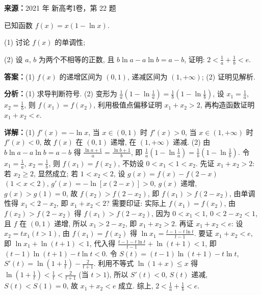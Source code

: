 \begin{question}[points=12]
\textbf{来源：}2021 年 新高考I卷，第 22 题\par
已知函数 $f(x) = x(1 - \ln x)$.

(1) 讨论 $f(x)$ 的单调性;

(2) 设 $a$, $b$ 为两个不相等的正数, 且 $b\ln a - a\ln b = a - b$, 证明: $2 < \frac{1}{a} + \frac{1}{b} < e$.
\begin{solution}
\textbf{答案：}(1) $f(x)$ 的递增区间为 $(0,1)$, 递减区间为 $(1,+\infty)$; (2) 证明见解析.

\textbf{分析：}(1) 求导判断符号. (2) 变形为 $\frac{1}{a}(1-\ln\frac{1}{a}) = \frac{1}{b}(1-\ln\frac{1}{b})$, 设 $x_1 = \frac{1}{a}$, $x_2 = \frac{1}{b}$, 则 $f(x_1) = f(x_2)$, 利用极值点偏移证明 $x_1 + x_2 > 2$, 再构造函数证明 $x_1 + x_2 < e$.

\textbf{详解：}(1) $f'(x) = -\ln x$, 当 $x \in (0,1)$ 时 $f'(x) > 0$, 当 $x \in (1,+\infty)$ 时 $f'(x) < 0$, 故 $f(x)$ 在 $(0,1)$ 递增, 在 $(1,+\infty)$ 递减.
(2) 由 $b\ln a - a\ln b = a - b$ 得 $\frac{\ln a + 1}{a} = \frac{\ln b + 1}{b}$, 即 $\frac{1}{a}(1-\ln\frac{1}{a}) = \frac{1}{b}(1-\ln\frac{1}{b})$. 令 $x_1 = \frac{1}{a}$, $x_2 = \frac{1}{b}$, 则 $f(x_1) = f(x_2)$, 不妨设 $0 < x_1 < 1 < x_2$. 先证 $x_1 + x_2 > 2$: 若 $x_2 \geq 2$, 显然成立; 若 $1 < x_2 < 2$, 设 $g(x) = f(x) - f(2-x)$ $(1 < x < 2)$, $g'(x) = -\ln[x(2-x)] > 0$, $g(x)$ 递增, $g(x) > g(1) = 0$, 故 $f(x_2) > f(2-x_2)$, 即 $f(x_1) > f(2-x_2)$, 由单调性得 $x_1 < 2 - x_2$, 即 $x_1 + x_2 < 2$? 需要印证: 实际上 $f(x_1)=f(x_2)$, 由 $f(x_2) > f(2-x_2)$ 得 $f(x_1) > f(2-x_2)$, 因为 $0<x_1<1$, $0<2-x_2<1$, 且 $f$ 在 $(0,1)$ 递增, 所以 $x_1 > 2 - x_2$, 即 $x_1 + x_2 > 2$. 再证 $x_1 + x_2 < e$: 设 $x_2 = t x_1 (t>1)$, 由 $f(x_1)=f(x_2)$ 得 $\ln x_1 = \frac{t-1 - t\ln t}{t-1}$. 要证 $x_1 + x_2 < e$, 即 $\ln x_1 + \ln(t+1) < 1$, 代入得 $\frac{t-1 - t\ln t}{t-1} + \ln(t+1) < 1$, 即 $(t-1)\ln(t+1) - t\ln t < 0$. 令 $S(t) = (t-1)\ln(t+1) - t\ln t$, $S'(t) = \ln(1+\frac{1}{t}) - \frac{2}{t+1}$. 利用不等式 $\ln(1+x) \leq x$ 得 $\ln(1+\frac{1}{t}) < \frac{1}{t} < \frac{2}{t+1}$ (当 $t>1$), 所以 $S'(t) < 0$, $S(t)$ 递减, $S(t) < S(1) = 0$, 故 $x_1 + x_2 < e$ 成立. 综上, $2 < \frac{1}{a} + \frac{1}{b} < e$.
\end{solution}
\end{question}


